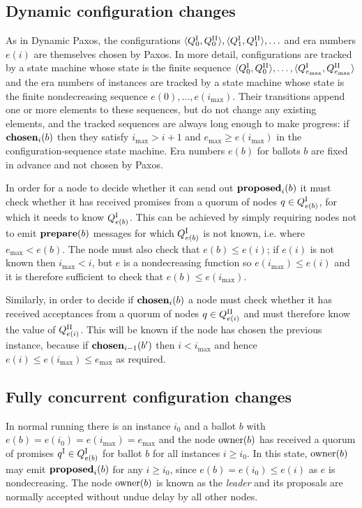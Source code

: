\documentclass[journal]{IEEEtran}
\begin{document}
\subsection{Dynamic configuration changes}

As in Dynamic Paxos, the configurations $\langle {Q}^\textrm{I}_{0}, {Q}^\textrm{II}_{0} \rangle,
\langle {Q}^\textrm{I}_{1}, {Q}^\textrm{II}_{1} \rangle, \ldots$ and era numbers $e(i)$ are themselves
chosen by Paxos. In more detail, configurations are tracked by a state machine
whose state is the finite sequence $\langle {Q}^\textrm{I}_{0}, {Q}^\textrm{II}_{0} \rangle, \ldots,
\langle {Q}^\textrm{I}_{e_\mathrm{max}}, {Q}^\textrm{II}_{e_\mathrm{max}} \rangle$ and the era numbers
of instances are tracked by a state machine whose state is the finite
nondecreasing sequence $e(0), \ldots, e(i_\mathrm{max})$.  Their transitions
append one or more elements to these sequences, but do not change any existing
elements, and the tracked sequences are always long enough to make progress: if
$\mathbf{chosen}_{i}(b)$ then they satisfy $i_\mathrm{max} > i+1$ and $e_\mathrm{max}
\ge e(i_\mathrm{max})$ in the configuration-sequence state machine. Era numbers
$e(b)$ for ballots $b$ are fixed in advance and not chosen by Paxos.

In order for a node to decide whether it can send out $\mathbf{proposed}_{i}(b)$ it must
check whether it has received promises from a quorum of nodes $q \in
{Q}^\textrm{I}_{e(b)}$, for which it needs to know ${Q}^\textrm{I}_{e(b)}$. This
can be achieved by simply requiring nodes not to emit $\mathbf{prepare}(b)$ messages for
which ${Q}^\textrm{I}_{e(b)}$ is not known, i.e. where $e_\mathrm{max}
< e(b)$. The node must also check that $e(b) \le e(i)$; if $e(i)$ is not known
then $i_\mathrm{max} < i$, but $e$ is a nondecreasing function so
$e(i_\mathrm{max}) \le e(i)$ and it is therefore sufficient to check that $e(b)
\le e(i_\mathrm{max})$.

Similarly, in order to decide if $\mathbf{chosen}_{i}(b)$ a node must check whether it
has received acceptances from a quorum of nodes $q \in {Q}^\textrm{II}_{e(i)}$
and must therefore know the value of ${Q}^\textrm{II}_{e(i)}$. This will be known
if the node has chosen the previous instance, because if $\mathbf{chosen}_{i-1}(b')$
then $i < i_\mathrm{max}$ and hence ${e(i) \le e(i_\mathrm{max}) \le
e_\mathrm{max}}$ as required.

\subsection{Fully concurrent configuration changes}

In normal running there is an instance $i_0$ and a ballot $b$ with ${e(b) =
e(i_0) = e(i_\mathrm{max}) = e_\mathrm{max}}$ and the node $\mathrm{owner}(b)$ has
received a quorum of promises $q^\textrm{I} \in {Q}^\textrm{I}_{e(b)}$ for ballot $b$ for
all instances $i \ge i_0$. In this state, $\mathrm{owner}(b)$ may emit $\mathbf{proposed}_{i}(b)$
for any $i \ge i_0$, since $e(b) = e(i_0) \le e(i)$ as $e$ is nondecreasing.
The node $\mathrm{owner}(b)$ is known as the \textit{leader} and its proposals are
normally accepted without undue delay by all other nodes.
\end{document}

